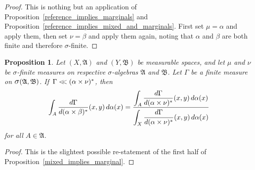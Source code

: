 \documentclass[
twoside=true,
paper=letter,
fontsize=9pt,
pagesize=auto,
leqno,
openany,
headsepline,
overfullrule,
]{scrbook}
\theoremstyle{plain}
\theoremstyle{plain}
\newtheorem{prop}[thm]{Proposition}
\theoremstyle{definition}
\theoremstyle{bfnoteitalic}
\theoremstyle{bfnoteroman}
\newcommand{\sigalg}[1]{\mathfrak{#1}}
\newcommand{\sagb}{\mathop{\hbox{\large{$\sigma$}}}\nolimits}
\newcommand{\textsigma}{\hbox{\large{$\sigma$}}\kern-1pt}
\newcommand{\sigmaalgebra}{\sigalg{A}}
\newcommand{\sigmaalgebraii}{\sigalg{B}}
\newcommand{\productsig}[2]{\sagb(#1,#2)}
\newcommand{\lilstrut}{\vphantom{\bigl(}}
\newcommand{\measurespace}{X}
\newcommand{\measurespaceii}{Y}
\newcommand{\mspaceelt}{x}
\newcommand{\mspaceeltii}{y}
\newcommand{\abscont}{\mathrel{< \kern-3.5pt <}}
\newcommand{\measure}{\mu}
\newcommand{\measmu}{\mu}
\newcommand{\measureii}{\nu}
\newcommand{\measnu}{\nu}
\newcommand{\seti}{A}
\newcommand{\measonprod}{\Gamma}%
\newcommand{\marginalone}{\alpha}%
\newcommand{\marginaltwo}{\beta}%
\begin{document}
\begin{proof}
This is nothing but an application of Proposition~\ref{reference_implies_marginals} and Proposition~\ref{reference_implies_mixed_and_marginals}. First set $\measmu=\marginalone$ and apply them, then set $\measnu=\marginaltwo$ and apply them again, noting that $\marginalone$ and $\marginaltwo$ are both finite and therefore \textsigma\hyp{}finite.
\end{proof}


\begin{prop}\label{mixed_implies_half}
Let
$(\measurespace, \sigmaalgebra)$
and
$(\measurespaceii, \sigmaalgebraii)$
be measurable spaces, and let $\measure$ and $\measureii$
be \textsigma-finite measures on  respective \textsigma-algebras
$\sigmaalgebra$ and $\sigmaalgebraii$.
Let $\measonprod$ be a finite measure on
$\productsig{\sigmaalgebra}{\sigmaalgebraii}$.
If\,
$\measonprod \abscont (\marginalone\times\measnu)^*$, then
\[
\int_\seti
\frac{d\measonprod}{d(\marginalone\times\marginaltwo)^*}
(\mspaceelt,\mspaceeltii)\,d\marginalone(\mspaceelt)
=
\frac{\displaystyle
\int_\seti
\dfrac{d\measonprod}{d(\marginalone\times\measnu)^*}(\mspaceelt,\mspaceeltii)
\,d\marginalone(\mspaceelt)
}
{\displaystyle
\int_\measurespace
\dfrac{d\measonprod\lilstrut}{d(\marginalone\times\measnu)^*}(\mspaceelt,\mspaceeltii)
\,d\marginalone(\mspaceelt)
}
\]
for all $\seti\in\sigmaalgebra$.
\end{prop}


\begin{proof}
This is the slightest possible re-statement of the first half of Proposition~\ref{mixed_implies_marginal}.
\end{proof}
\end{document}
